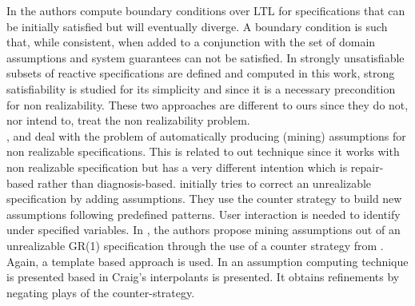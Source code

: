 In \cite{DBLP:conf/kbse/DegiovanniRACA16} the authors compute boundary conditions over LTL for specifications that can be initially satisfied but will eventually diverge.  A boundary condition is such that, while consistent, when added to a conjunction with the set of domain assumptions and system guarantees can not be satisfied.
In \cite{DBLP:conf/kbse/HagiharaESY14} strongly
unsatisfiable subsets of reactive specifications are defined and computed in this work, strong satisfiability is studied for its simplicity and since it is a necessary precondition for non realizability. These two approaches are different to ours since they do not, nor intend to, treat the non realizability problem.\\
\cite{DBLP:conf/fmcad/AlurMT13}, \cite{DBLP:conf/memocode/LiDS11} and
\cite{DBLP:conf/tacas/CavezzaA17} deal with the problem of automatically producing 
(mining) assumptions for non realizable specifications.  This is related to out technique since it works with non realizable specification
but has a very different intention which is  repair-based rather than diagnosis-based.
\cite{DBLP:conf/fmcad/AlurMT13} initially tries to correct an unrealizable specification by adding assumptions.  They use the counter strategy to build new assumptions following predefined patterns.  User interaction is needed to identify under specified variables.
In \cite{DBLP:conf/memocode/LiDS11}, the authors propose mining assumptions out of an unrealizable GR(1) specification through the use of a counter strategy from \cite{DBLP:conf/hvc/KonighoferHB10}. Again, a template based approach is used.
In \cite{DBLP:conf/tacas/CavezzaA17} an assumption computing technique is presented based in Craig's interpolants is presented.  It obtains refinements by negating plays of the counter-strategy.\\
